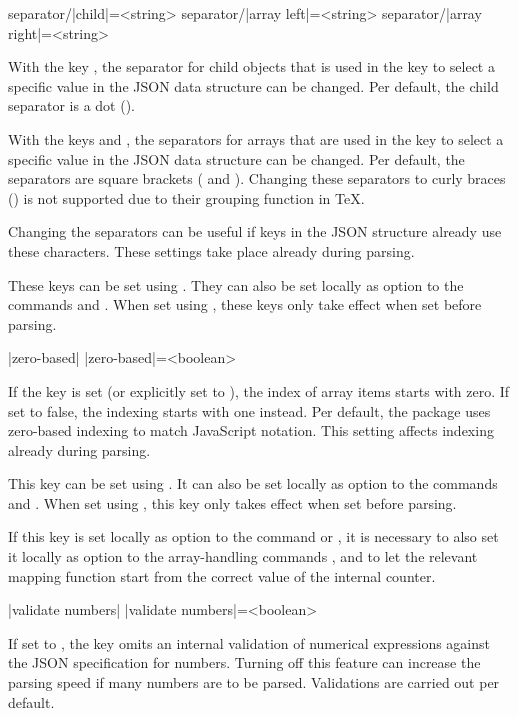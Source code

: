 \documentclass[a4paper]{article}
\begin{document}
{{\begin{macrodef}
separator/|child|={<string>}
separator/|array left|={<string>}
separator/|array right|={<string>}
\end{macrodef}
With the key , the separator for child objects that is used in the key to select a specific value in the JSON data structure can be changed. Per default, the child separator is a dot ().

With the keys  and , the separators for arrays that are used in the key to select a specific value in the JSON data structure can be changed. Per default, the separators are square brackets (\macro{[} and \macro{]}). Changing these separators to curly braces (\macro{{}}) is not supported due to their grouping function in TeX.

Changing the separators can be useful if keys in the JSON structure already use these characters. These settings take place already during parsing.

These keys can be set using \macro{\JSONParseSet}. They can also be set locally as option to the commands \macro{\JSONParse} and \macro{\JSONParseFromFile}. When set using \macro{\JSONParseSet}, these keys only take effect when set before parsing.

\begin{macrodef}
|zero-based|
|zero-based|={<boolean>}
\end{macrodef}
If the key  is set (or explicitly set to ), the index of array items starts with zero. If set to false, the indexing starts with one instead. Per default, the package uses zero-based indexing to match JavaScript notation. This setting affects indexing already during parsing.

This key can be set using \macro{\JSONParseSet}. It can also be set locally as option to the commands \macro{\JSONParse} and \macro{\JSONParseFromFile}. When set using \macro{\JSONParseSet}, this key only takes effect when set before parsing.

If this key is set locally as option to the command \macro{\JSONParse} or \macro{\JSONParseFromFile}, it is necessary to also set it locally as option to the array-handling commands \macro{\JSONParseArrayUse}, \macro{\JSONParseArrayMapFunction} and \macro{\JSONParseArrayMapInline} to let the relevant mapping function start from the correct value of the internal counter.

\begin{macrodef}
|validate numbers|
|validate numbers|={<boolean>}
\end{macrodef}
If set to , the key  omits an internal validation of numerical expressions against the JSON specification for numbers. Turning off this feature can increase the parsing speed if many numbers are to be parsed. Validations are carried out per default.

}}
\end{document}
